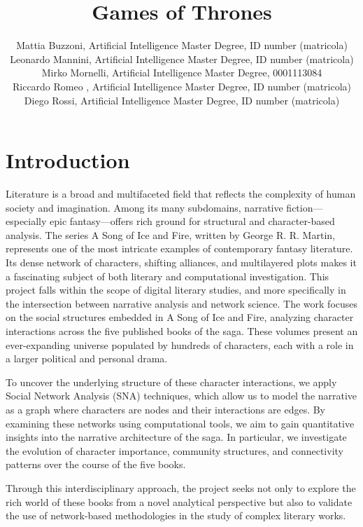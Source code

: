 \documentclass[12pt, a4paper]{article}
\author{Mattia Buzzoni, Artificial Intelligence Master Degree, ID number (matricola)
\\Leonardo Mannini, Artificial Intelligence Master Degree, ID number (matricola)
\\ Mirko Mornelli, Artificial Intelligence Master Degree, 0001113084
\\Riccardo Romeo , Artificial Intelligence Master Degree, ID number (matricola)
\\Diego Rossi, Artificial Intelligence Master Degree, ID number (matricola)}
\date{}
\title{Games of Thrones}
\begin{document}
\maketitle

\section{Introduction}
\label{introduction}
\begin{comment}
(The history of the 5 books)
The context includes: the general field (e.g., literature, history,
archaeology, tourism, biology, forensics, religious studies); the
specific application (e.g., literary analysis, quantitative history,
genetics, virology, forensics intelligence, tourism planning, biblical
quantitative studies).
\end{comment}
Literature is a broad and multifaceted field that reflects the complexity of human society and imagination. Among its many subdomains, narrative fiction—especially epic fantasy—offers rich ground for structural and character-based analysis. The series A Song of Ice and Fire, written by George R. R. Martin, represents one of the most intricate examples of contemporary fantasy literature. Its dense network of characters, shifting alliances, and multilayered plots makes it a fascinating subject of both literary and computational investigation. 
This project falls within the scope of digital literary studies, and more specifically in the intersection between narrative analysis and network science. The work focuses on the social structures embedded in A Song of Ice and Fire, analyzing character interactions across the five published books of the saga. These volumes present an ever-expanding universe populated by hundreds of characters, each with a role in a larger political and personal drama.

To uncover the underlying structure of these character interactions, we apply Social Network Analysis (SNA) techniques, which allow us to model the narrative as a graph where characters are nodes and their interactions are edges. By examining these networks using computational tools, we aim to gain quantitative insights into the narrative architecture of the saga. In particular, we investigate the evolution of character importance, community structures, and connectivity patterns over the course of the five books.

Through this interdisciplinary approach, the project seeks not only to explore the rich world of these books from a novel analytical perspective but also to validate the use of network-based methodologies in the study of complex literary works.
\end{document}

